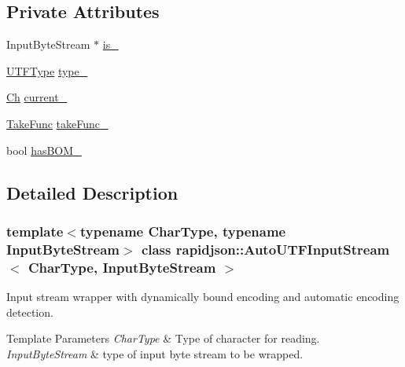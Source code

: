 \subsection*{Private Attributes}
\begin{DoxyCompactItemize}
\item 
Input\+Byte\+Stream $\ast$ \mbox{\hyperlink{classrapidjson_1_1_auto_u_t_f_input_stream_a6114c671ce8f40f2d4fdc33f95b8db61}{is\+\_\+}}
\item 
\mbox{\hyperlink{namespacerapidjson_a4aacabc0f8cea1cd628f466d890773eb}{U\+T\+F\+Type}} \mbox{\hyperlink{classrapidjson_1_1_auto_u_t_f_input_stream_a5549d9046ead614c3511d4991c6456fa}{type\+\_\+}}
\item 
\mbox{\hyperlink{classrapidjson_1_1_auto_u_t_f_input_stream_a6d9eca095f7ef8c249ebe43568d66d0e}{Ch}} \mbox{\hyperlink{classrapidjson_1_1_auto_u_t_f_input_stream_a7852a25c4948cc8488046b01fc373967}{current\+\_\+}}
\item 
\mbox{\hyperlink{classrapidjson_1_1_auto_u_t_f_input_stream_a26a3023cacf9438e5403dee700a7a5c1}{Take\+Func}} \mbox{\hyperlink{classrapidjson_1_1_auto_u_t_f_input_stream_a43869dc456b08e0a79b6ab788b7541bb}{take\+Func\+\_\+}}
\item 
bool \mbox{\hyperlink{classrapidjson_1_1_auto_u_t_f_input_stream_adb35deeb95d187bd398832ede42319f6}{has\+B\+O\+M\+\_\+}}
\end{DoxyCompactItemize}


\subsection{Detailed Description}
\subsubsection*{template$<$typename Char\+Type, typename Input\+Byte\+Stream$>$\newline
class rapidjson\+::\+Auto\+U\+T\+F\+Input\+Stream$<$ Char\+Type, Input\+Byte\+Stream $>$}

Input stream wrapper with dynamically bound encoding and automatic encoding detection. 


\begin{DoxyTemplParams}{Template Parameters}
{\em Char\+Type} & Type of character for reading. \\
\hline
{\em Input\+Byte\+Stream} & type of input byte stream to be wrapped. \\
\hline
\end{DoxyTemplParams}


